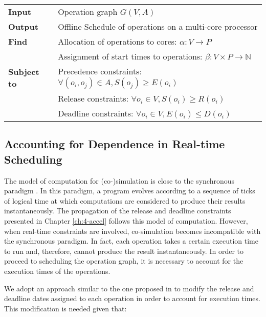 \begin{table}[H]
\centering
\begin{tabular}{l  l}
  \rule{0pt}{5ex}	
	\textbf{Input} & Operation graph $G(V,A)$\\
	\rule{0pt}{5ex}									  
	
  \textbf{Output} & Offline Schedule of operations on a multi-core processor\\
	\rule{0pt}{5ex}									  
  
	\textbf{Find} & Allocation of operations to cores: $\alpha: V \rightarrow P$\\
                & Assignment of start times to operations: $\beta: V \times P \rightarrow \mathbb{N}$\\
	\rule{0pt}{5ex}								 
	
	\textbf{Subject to} & Precedence constraints: $\forall (o_i,o_j) \in A, S(o_j) \geq E(o_i)$\\
											& Release constraints: $\forall o_i \in V, S(o_i) \geq R(o_i)$\\
											& Deadline constraints: $\forall o_i \in V, E(o_i) \leq D(o_i)$\\
										 
	
\end{tabular}
\end{table}

\subsection{Accounting for Dependence in Real-time Scheduling}

The model of computation for (co-)simulation is close to the synchronous paradigm \cite{benveniste:1991synchronous,benveniste:2003}. In this paradigm, a program evolves according to a sequence of ticks of logical time at which computations are considered to produce their results instantaneously. The propagation of the release and deadline constraints presented in Chapter \ref{ch:4-accel} follows this model of computation. However, when real-time constraints are involved, co-simulation becomes incompatible with the synchronous paradigm. In fact, each operation takes a certain execution time to run and, therefore, cannot produce the result instantaneously. In order to proceed to scheduling the operation graph, it is necessary to account for the execution times of the operations.

We adopt an approach similar to the one proposed in \cite{chetto:1990} to modify the release and deadline dates assigned to each operation in order to account for execution times. This modification is needed given that:

